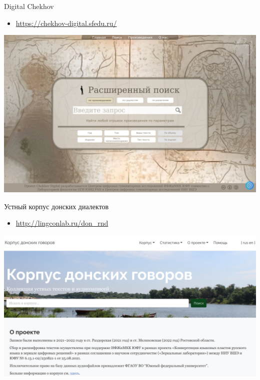 \documentclass[
  ignorenonframetext,
]{beamer}
\providecommand{\tightlist}{%
  \setlength{\itemsep}{0pt}\setlength{\parskip}{0pt}}
\begin{document}
\begin{frame}{Digital Chekhov}
\protect\hypertarget{digital-chekhov}{}
\begin{itemize}
\tightlist
\item
  \url{https://chekhov-digital.sfedu.ru/}
\end{itemize}

\begin{center}\includegraphics[width=0.95\linewidth]{images/06_digital_chekhov} \end{center}
\end{frame}

\begin{frame}{Устный корпус донских диалектов}
\protect\hypertarget{ux443ux441ux442ux43dux44bux439-ux43aux43eux440ux43fux443ux441-ux434ux43eux43dux441ux43aux438ux445-ux434ux438ux430ux43bux435ux43aux442ux43eux432}{}
\begin{itemize}
\tightlist
\item
  \url{http://lingconlab.ru/don_rnd}
\end{itemize}

\begin{center}\includegraphics[width=0.98\linewidth]{images/don1} \end{center}
\end{frame}
\end{document}

